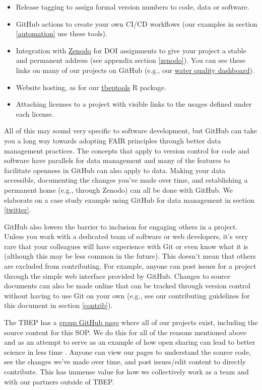 \documentclass[
]{book}
\providecommand{\tightlist}{%
  \setlength{\itemsep}{0pt}\setlength{\parskip}{0pt}}
\begin{document}
\begin{itemize}
\tightlist
\item
  Release tagging to assign formal version numbers to code, data or software.
\item
  GitHub actions to create your own CI/CD workflows (our examples in section \ref{automation} use these tools).
\item
  Integration with \href{https://zenodo.org/}{Zenodo} for DOI assignments to give your project a stable and permanent address (see appendix section \ref{zenodo}). You can see these links on many of our projects on GitHub (e.g., our \href{https://github.com/tbep-tech/wq-dash}{water quality dashboard}).\\
\item
  Website hosting, as for our \href{https://tbep-tech.github.io/tbeptools/}{tbeptools} R package.
\item
  Attaching licenses to a project with visible links to the usages defined under each license.
\end{itemize}

All of this may sound very specific to software development, but GitHub can take you a long way towards adopting FAIR principles through better data management practices. The concepts that apply to version control for code and software have parallels for data management and many of the features to facilitate openness in GitHub can also apply to data. Making your data accessible, documenting the changes you've made over time, and establishing a permanent home (e.g., through Zenodo) can all be done with GitHub. We elaborate on a case study example using GitHub for data management in section \ref{twitter}.

GitHub also lowers the barrier to inclusion for engaging others in a project. Unless you work with a dedicated team of software or web developers, it's very rare that your colleagues will have experience with Git or even know what it is (although this may be less common in the future). This doesn't mean that others are excluded from contributing. For example, anyone can post issues for a project through the simple web interface provided by GitHub. Changes to source documents can also be made online that can be tracked through version control without having to use Git on your own (e.g., see our contributing guidelines for this document in section \ref{contrib}).

The TBEP has a \href{https://github.com/tbep-tech}{group GitHub page} where all of our projects exist, including the source content for this SOP. We do this for all of the reasons mentioned above and as an attempt to serve as an example of how open sharing can lead to better science in less time \citep{Lowndes17}. Anyone can view our pages to understand the source code, see the changes we've made over time, and post issues/edit content to directly contribute. This has immense value for how we collectively work as a team and with our partners outside of TBEP.
\end{document}
